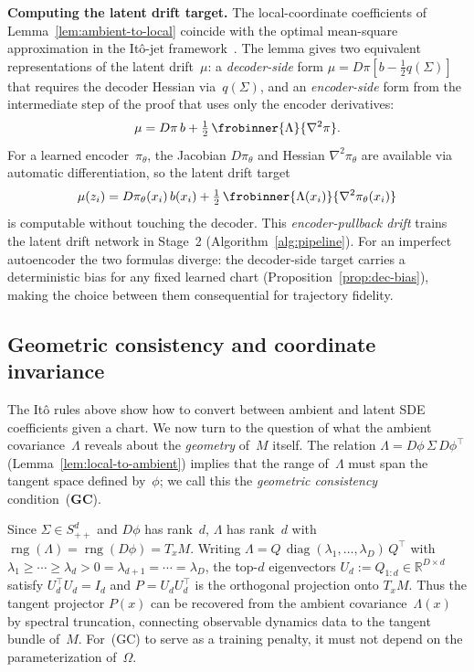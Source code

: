 \documentclass[11pt]{article}
\newcommand{\R}{\mathbb{R}}
\newcommand{\Om}{\Omega}
\newcommand{\diag}{\operatorname{diag}}
\newcommand{\rng}{\operatorname{rng}}
\begin{document}
\noindent\textbf{Computing the latent drift target.}\label{ssec:enc-pull}
The local-coordinate coefficients of
Lemma~\ref{lem:ambient-to-local} coincide with
the optimal mean-square approximation in the It\^o-jet
framework~\cite{armstrong2018intrinsicjets,Armstrong2024}.
The lemma gives two equivalent representations
of the latent drift~$\mu$: a \emph{decoder-side} form
$\mu = D\pi[b - \tfrac{1}{2}q(\Sigma)]$ that requires the
decoder Hessian via~$q(\Sigma)$, and an \emph{encoder-side} form
from the intermediate step of the proof that uses only the
encoder derivatives:
\begin{equation}\label{eq:enc-pull}
  \mu
  = D\pi\,b + \tfrac{1}{2}\,\frobinner{\Lambda}{\nabla^2\pi}.
\end{equation}
For a learned encoder~$\pi_\theta$, the Jacobian $D\pi_\theta$
and Hessian $\nabla^2\pi_\theta$ are available via automatic
differentiation, so the latent drift target
\begin{equation}\label{eq:enc-pull-target}
  \mu(z_i)
  = D\pi_\theta(x_i)\,b(x_i)
    + \tfrac{1}{2}\,\frobinner{\Lambda(x_i)}{\nabla^2\pi_\theta(x_i)}
\end{equation}
is computable without touching the decoder.
This \emph{encoder-pullback drift} trains the latent drift
network in Stage~2 (Algorithm~\ref{alg:pipeline}).
For an imperfect autoencoder the two formulas diverge: the
decoder-side target carries a deterministic bias for any fixed
learned chart
(Proposition~\ref{prop:dec-bias}), making the choice between them
consequential for trajectory fidelity.

\subsection{Geometric consistency and coordinate invariance}\label{ssec:tangent-from-cov}

The Itô rules above show how to convert between ambient and latent
SDE coefficients given a chart.
We now turn to the question of what the ambient covariance~$\Lambda$
reveals about the \emph{geometry} of~$M$ itself.
The relation $\Lambda = D\phi\,\Sigma\,D\phi^\top$
(Lemma~\ref{lem:local-to-ambient}) implies that the
range of~$\Lambda$ must span the tangent space defined by~$\phi$;
we call this the \emph{geometric consistency} condition~(\textbf{GC}).

Since $\Sigma\in S_{++}^d$ and $D\phi$ has rank~$d$,
$\Lambda$ has rank~$d$ with
$\rng(\Lambda) = \rng(D\phi) = T_xM$.
Writing
$\Lambda = Q\,\diag(\lambda_1,\dots,\lambda_D)\,Q^\top$
with $\lambda_1\ge\cdots\ge\lambda_d > 0
= \lambda_{d+1}=\cdots=\lambda_D$,
the top-$d$ eigenvectors
$U_d := Q_{1:d}\in\R^{D\times d}$ satisfy
$U_d^\top U_d = I_d$ and
$P = U_d U_d^\top$ is the orthogonal projection onto
$T_xM$.
Thus the tangent projector $P(x)$ can be recovered from
the ambient covariance~$\Lambda(x)$ by spectral
truncation, connecting observable dynamics data to the
tangent bundle of~$M$.
For~(GC) to serve as a training penalty, it must
not depend on the parameterization of~$\Om$.
\end{document}
